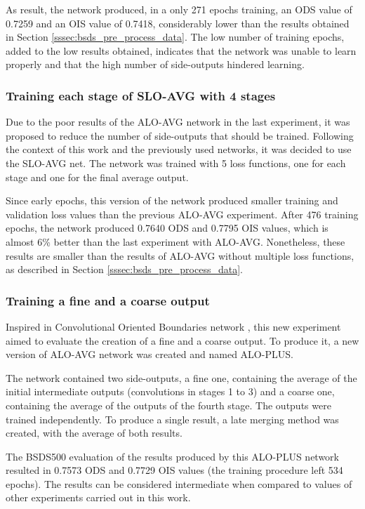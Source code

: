 As result, the network produced, in a only 271 epochs training, an ODS value of 0.7259 and an OIS value of 0.7418, considerably lower than the results obtained in Section \ref{sssec:bsds_pre_process_data}.
The low number of training epochs, added to the low results obtained, indicates that the network was unable to learn properly and that the high number of side-outputs hindered learning.

\subsubsection{Training each stage of SLO-AVG with 4 stages}
\label{sssec:train_stage_slo_avg}

Due to the poor results of the ALO-AVG network in the last experiment, it was proposed to reduce the number of side-outputs that should be trained.
Following the context of this work and the previously used networks, it was decided to use the SLO-AVG net.
The network was trained with 5 loss functions, one for each stage and one for the final average output.

Since early epochs, this version of the network produced smaller training and validation loss values than the previous ALO-AVG experiment.
After 476 training epochs, the network produced 0.7640 ODS and 0.7795 OIS values, which is almost 6\% better than the last experiment with ALO-AVG.
Nonetheless, these results are smaller than the results of ALO-AVG without multiple loss functions, as described in Section \ref{sssec:bsds_pre_process_data}.

\subsubsection{Training a fine and a coarse output}
\label{sssec:train_alo_plus}

Inspired in Convolutional Oriented Boundaries network \cite{COB:2016}, this new experiment aimed to evaluate the creation of a fine and a coarse output.
To produce it, a new version of ALO-AVG network was created and named ALO-PLUS.

The network contained two side-outputs, a fine one, containing the average of the initial intermediate outputs (convolutions in stages 1 to 3) and a coarse one, containing the average of the outputs of the fourth stage.
The outputs were trained independently.
To produce a single result, a late merging method was created, with the average of both results.

The BSDS500 evaluation of the results produced by this ALO-PLUS network resulted in 0.7573 ODS and 0.7729 OIS values (the training procedure left 534 epochs).
The results can be considered intermediate when compared to values of other experiments carried out in this work.

